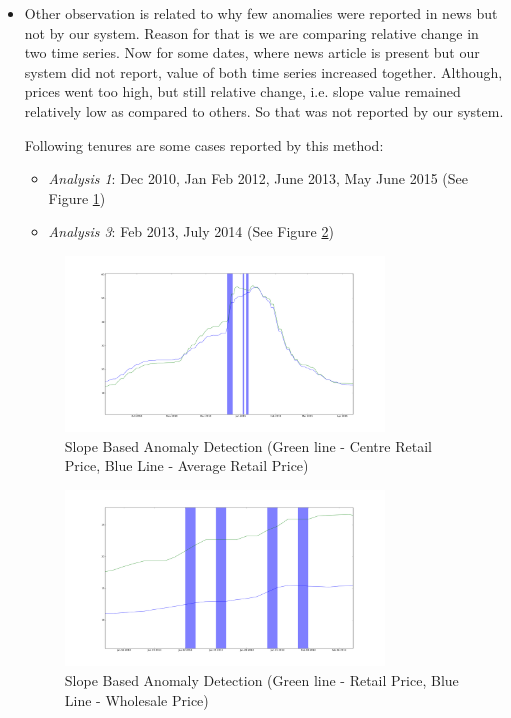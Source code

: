 \begin{itemize}
			
			
			
			
			\item Other observation is related to why few anomalies were reported in news but not by our system. Reason for that is we are comparing relative change in two time series. Now for some dates, where news article is present but our system did not report, value of both time series increased together. Although, prices went too high, but still relative change, i.e. slope value remained relatively low as compared to others. So that was not reported by our system.
				
			Following tenures are some cases reported by this method:
			\begin{itemize}
				\item \textit{Analysis 1}: Dec 2010, Jan Feb 2012, June 2013, May June 2015   (See Figure \ref{fig:12113})
				\item \textit{Analysis 3}: Feb 2013, July 2014   (See Figure \ref{fig:12133})
			\end{itemize}
			
			\begin{figure}[H]
		    	\centering
  		    	\includegraphics[width=0.8\textwidth]{graphs/12113.png}
		    	\caption{Slope Based Anomaly Detection (Green line - Centre Retail Price, Blue Line - Average Retail Price)}
		    	\label{fig:12113}
			\end{figure}
			
			\begin{figure}[H]
		    	\centering
  		    	\includegraphics[width=0.8\textwidth]{graphs/12133.png}
		    	\caption{Slope Based Anomaly Detection (Green line - Retail Price, Blue Line - Wholesale Price)}
		    	\label{fig:12133}
			\end{figure}
			

\end{itemize}
